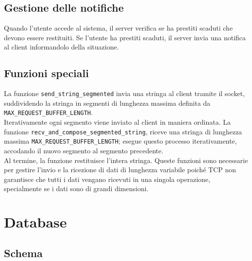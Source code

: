 \documentclass[]{report}
\begin{document}
\section{Gestione delle notifiche}
Quando l'utente accede al sistema, il server verifica se ha prestiti scaduti che devono essere restituiti. Se l'utente ha prestiti scaduti, il server invia una notifica al client informandolo della situazione.

\section{Funzioni speciali}
La funzione \texttt{send\_string\_segmented} invia una stringa al client tramite il socket, suddividendo la stringa in segmenti di lunghezza massima definita da \texttt{MAX\_REQUEST\_BUFFER\_LENGTH}.\\
Iterativamente ogni segmento viene inviato al client in maniera ordinata. \meskip
La funzione \texttt{recv\_and\_compose\_segmented\_string}, riceve una stringa di lunghezza \\ massima \texttt{MAX\_REQUEST\_BUFFER\_LENGTH}; esegue questo processo iterativamente, accodando il nuovo segmento al segmento precedente.\\
Al termine, la funzione restituisce l'intera stringa.\bskip
Queste funzioni sono necessarie per gestire l'invio e la ricezione di dati di lunghezza variabile poiché TCP non garantisce che tutti i dati vengano ricevuti in una singola operazione, specialmente se i dati sono di grandi dimensioni.


\chapter{Database}
\section{Schema}
\end{document}
